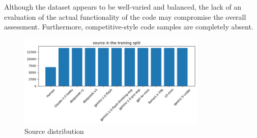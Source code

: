 

Although the dataset appears to be well-varied and balanced, 
the lack of an evaluation of the actual functionality of the code 
may compromise the overall assessment. Furthermore, 
competitive-style code samples are completely absent.

\begin{figure}[H]
    \centering
    \includegraphics[width=0.8\textwidth]{img/CodeMirage/source.png}
    \caption{Source distribution}
    \label{fig:distribution}
\end{figure}